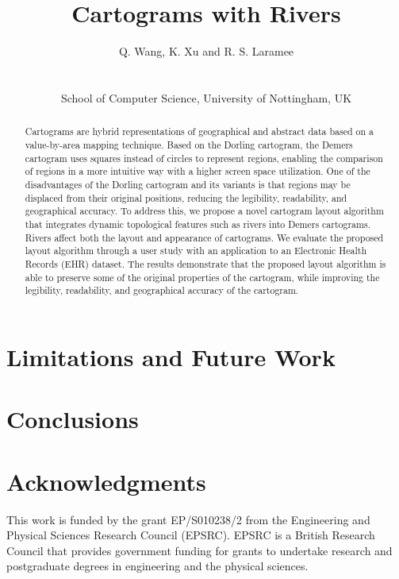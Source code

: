 \documentclass{egpubl}
\author[Q. Wang, K. Xu \& R. S. Laramee]
{\parbox{\textwidth}{\centering Q. Wang, K. Xu
  and R. S. Laramee
    }
    \\
\parbox{\textwidth}{\centering School of Computer Science, University of Nottingham, UK}
}
\title{Cartograms with Rivers}
\begin{document}
\pagestyle{plain}

\maketitle

\begin{abstract}
Cartograms are hybrid representations of geographical and abstract data based on a value-by-area mapping technique. Based on the Dorling cartogram, the Demers cartogram uses squares instead of circles to represent regions, enabling the comparison of regions in a more intuitive way with a higher screen space utilization. One of the disadvantages of the Dorling cartogram and its variants is that regions may be displaced from their original positions, reducing the legibility, readability, and geographical accuracy. To address this, we propose a novel cartogram layout algorithm that integrates dynamic topological features such as rivers into Demers cartograms. Rivers affect both the layout and appearance of cartograms. We evaluate the proposed layout algorithm through a user study with an application to an Electronic Health Records (EHR) dataset. The results demonstrate that the proposed layout algorithm is able to preserve some of the original properties of the cartogram, while improving the legibility, readability, and geographical accuracy of the cartogram. 
\end{abstract}











\section{Limitations and Future Work}

\section{Conclusions}

\section{Acknowledgments}
This work is funded by the grant EP/S010238/2 from the Engineering and Physical Sciences Research Council (EPSRC). EPSRC is a British Research Council that provides government funding for grants to undertake research and postgraduate degrees in engineering and the physical sciences.


\clearpage
\let\section=\origsection
\printbibliography

\cleardoublepage


\end{document}
